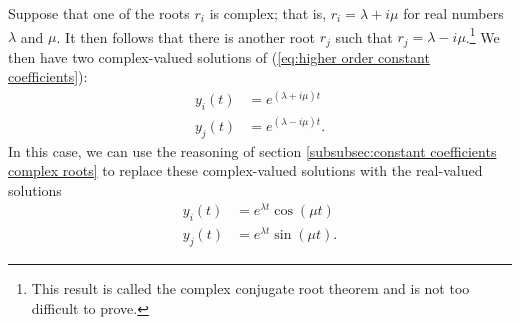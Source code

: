 \documentclass{myart}
\newcommand{\eq}[1]{(\ref{eq:#1})}
\begin{document}
Suppose that one of the roots $r_i$ is complex; that is, $r_i = \lambda + i \mu$ for real numbers $\lambda$ and $\mu$. It then follows that there is another root $r_j$ such that $r_j = \lambda - i \mu$.\footnote{This result is called the complex conjugate root theorem and is not too difficult to prove.} We then have two complex-valued solutions of \eq{higher order constant coefficients}:
\begin{align*}
y_i(t) &= e^{(\lambda + i \mu)t} \\
y_j(t) &= e^{(\lambda - i \mu)t}.
\end{align*}
In this case, we can use the reasoning of section \ref{subsubsec:constant coefficients complex roots} to replace these complex-valued solutions with the real-valued solutions
\begin{align*}
y_i(t) &= e^{\lambda t} \cos(\mu t) \\
y_j(t) &= e^{\lambda t} \sin(\mu t).
\end{align*}
\end{document}
